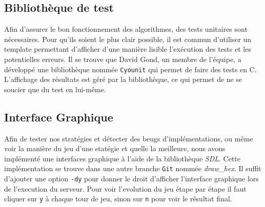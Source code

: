 \documentclass[a4paper, 12pt]{article}
\begin{document}
\subsection{Bibliothèque de test}
Afin d'assurer le bon fonctionnement des algorithmes, des tests unitaires sont nécessaires. Pour qu'ils soient le plus clair possible, il est commun d'utiliser un template permettant d'afficher d'une manière lisible l'exécution des tests et les potentielles erreurs. Il se trouve que David Gond, un membre de l'équipe, a développé une bibliothèque nommée \texttt{Cyounit} qui permet de faire des tests en C. L'affichage des résultats est géré par la bibliothèque, ce qui permet de ne se soucier que du test en lui-même.

\subsection{Interface Graphique}
Afin de tester nos stratégies et détecter des beugs d'implémentations, ou même voir la manière du jeu d'une statégie et quelle la meilleure, nous avons implémenté une interfaces graphique à l'aide de la bibliothèque \emph{SDL}. Cette implémentation se trouve dans une autre branche \texttt{Git} nommée \emph{draw\_hex}. Il suffit d'ajouter une option \texttt{-dy} pour donner le droit d'afficher l'interface graphique lors de l'execution du serveur. Pour voir l'evolution du jeu étape par étape il faut cliquer sur \texttt{y} à chaque tour de jeu, sinon sur \texttt{n} pour voir le résultat final.
\end{document}
